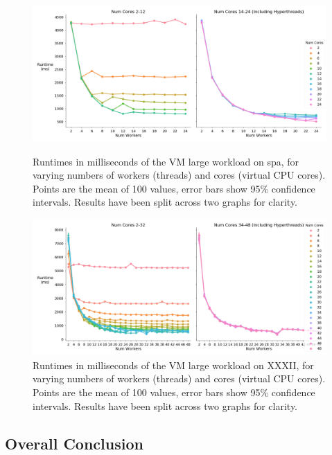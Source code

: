 \begin{figure}[H]
    \vspace*{-2.5cm}
    \centerline{\includegraphics[width=1.5\textwidth]{graphics/optimal_threads/spa/optimal_threads_vm_large.png}}
    \caption{Runtimes in milliseconds of the VM large workload on spa, for varying numbers of workers (threads) and cores (virtual CPU cores). Points are the mean of 100 values, error bars show 95\% confidence intervals. Results have been split across two graphs for clarity.}
    \label{fig:opt_spa_vm_large}
    
    \centerline{\includegraphics[width=1.5\textwidth]{graphics/optimal_threads/XXXII/optimal_threads_vm_large.png}}
    \caption{Runtimes in milliseconds of the VM large workload on XXXII, for varying numbers of workers (threads) and cores (virtual CPU cores). Points are the mean of 100 values, error bars show 95\% confidence intervals. Results have been split across two graphs for clarity.}
    \label{fig:opt_xxxii_vm_large}
\end{figure}



\subsection{Overall Conclusion}
\label{section:results:overall_conclusion}

